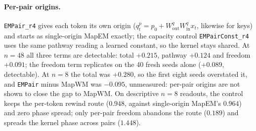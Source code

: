 \documentclass[10pt]{article}
\newcommand{\arm}[1]{\texttt{#1}}
\begin{document}
\paragraph{Per-pair origins.} \arm{EMPair\_r4} gives each token its own origin
($q^p_t=p_0+W^q_{\mathrm{out}}W^q_{\mathrm{in}}x_t$, likewise for keys) and starts as single-origin MapEM exactly;
the capacity control \arm{EMPairConst\_r4} uses the same pathway reading a learned constant, so the kernel stays
shared. At $n=48$ all three terms are detectable: total $+0.215$, pathway $+0.124$ and freedom $+0.091$; the freedom term
replicates on the 40 fresh seeds alone ($+0.089$, detectable). At $n=8$ the total was $+0.280$, so the first eight
seeds overstated it, and \arm{EMPair} minus MapWM was $-0.095$, unmeasured: per-pair origins are not shown to close
the gap to MapWM. On descriptive $n=8$ readouts, the control keeps the per-token rewind route ($0.948$, against
single-origin MapEM's $0.964$) and zero phase spread; only per-pair freedom abandons the route ($0.189$) and spreads
the kernel phase across pairs ($1.448$).
\end{document}

